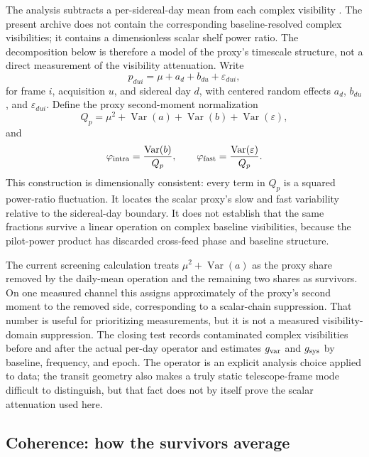 The analysis subtracts a per-sidereal-day mean from each complex visibility
\cite{amiri2023detection}.  The present archive does not contain the corresponding
baseline-resolved complex visibilities; it contains a dimensionless scalar shelf
power ratio.  The decomposition below is therefore a model of the proxy's
timescale structure, not a direct measurement of the visibility attenuation.
Write
\begin{equation}
\label{eq:tolerance:anova}
p_{dui}=\mu+a_d+b_{du}+\varepsilon_{dui},
\end{equation}
for frame $i$, acquisition $u$, and sidereal day $d$, with centered random
effects $a_d$, $b_{du}$, and $\varepsilon_{dui}$.  Define the proxy second-moment
normalization
\begin{equation}
 Q_p=\mu^2+\operatorname{Var}(a)+\operatorname{Var}(b)
       +\operatorname{Var}(\varepsilon),
\end{equation}
and
\begin{equation}
 \varphi_{\rm intra}=\frac{\operatorname{Var}(b)}{Q_p},
 \qquad
 \varphi_{\rm fast}=\frac{\operatorname{Var}(\varepsilon)}{Q_p}.
\end{equation}
This construction is dimensionally consistent: every term in $Q_p$ is a squared
power-ratio fluctuation.  It locates the scalar proxy's slow and fast variability
relative to the sidereal-day boundary.  It does not establish that the same
fractions survive a linear operation on complex baseline visibilities, because
the pilot-power product has discarded cross-feed phase and baseline structure.

The current screening calculation treats $\mu^2+\operatorname{Var}(a)$ as the
proxy share removed by the daily-mean operation and the remaining two shares as
survivors.  On one measured channel this assigns approximately  of the proxy's second
moment to the removed side, corresponding to a  scalar-chain
suppression.  That number is useful for prioritizing measurements, but it is not
a measured visibility-domain suppression.  The closing test records contaminated
complex visibilities before and after the actual per-day operator and estimates
$g_{\rm var}$ and $g_{\rm sys}$ by baseline, frequency, and epoch.  The operator
is an explicit analysis choice applied to data; the transit geometry also makes
a truly static telescope-frame mode difficult to distinguish, but that fact does
not by itself prove the scalar attenuation used here.

\subsection*{Coherence: how the survivors average}


